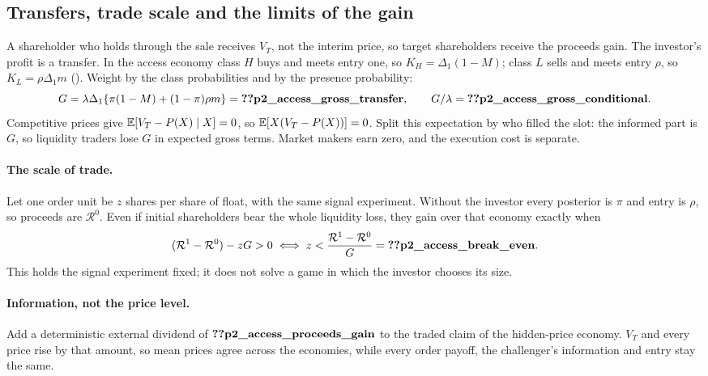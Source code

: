 \subsection{Transfers, trade scale and the limits of the gain}\label{sec:11_welfare-transfers}

A shareholder who holds through the sale receives \(V_T\), not the interim price, so target shareholders receive the
proceeds gain. The investor's profit is a transfer. In the access economy class \(H\) buys and meets entry one, so
\(K_H=\Delta_1(1-M)\); class \(L\) sells and meets entry \(\rho\), so \(K_L=\rho\Delta_1m\)
(). Weight by the class probabilities and by the presence probability:
\[
G=\lambda\Delta_1\{\pi(1-M)+(1-\pi)\rho m\}=\reg{p2_access_gross_transfer},\qquad
G/\lambda=\reg{p2_access_gross_conditional}.
\]
Competitive prices give \(\mathbb{E}[V_T-P(X)\mid X]=0\), so \(\mathbb{E}[X(V_T-P(X))]=0\). Split this expectation by who filled the
slot: the informed part is \(G\), so liquidity traders lose \(G\) in expected gross terms. Market makers earn zero, and
the execution cost is separate.

\paragraph{The scale of trade.} Let one order unit be \(z\) shares per share of float, with the same signal
experiment. Without the investor every posterior is \(\pi\) and entry is \(\rho\), so proceeds are \(\mathcal R^0\).
Even if initial shareholders bear the whole liquidity loss, they gain over that economy exactly when
\[
(\mathcal R^1-\mathcal R^0)-zG>0\iff z<\frac{\mathcal R^1-\mathcal R^0}{G}=\reg{p2_access_break_even}.
\]
This holds the signal experiment fixed; it does not solve a game in which the investor chooses its size.

\paragraph{Information, not the price level.} Add a deterministic external dividend of \(\reg{p2_access_proceeds_gain}\)
to the traded claim of the hidden-price economy. \(V_T\) and every price rise by that amount, so mean prices agree
across the economies, while every order payoff, the challenger's information and entry stay the same.

